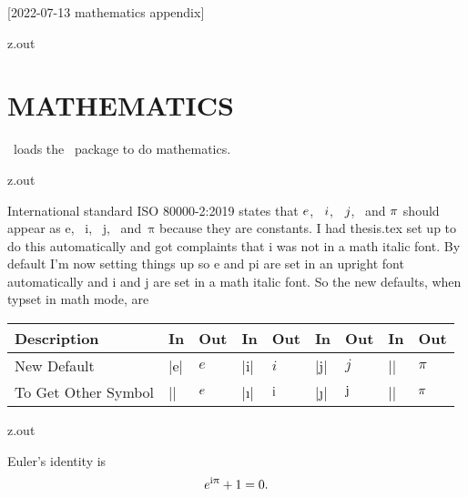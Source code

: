 [2022-07-13 mathematics appendix]

\begin{VerbatimOut}{z.out}
\chapter{MATHEMATICS}

\PurdueThesisLogo\ loads the \AMSmathLogo\ package
\cite{amslatex3project2019}
to do mathematics.
\end{VerbatimOut}

\MyIO




\begin{VerbatimOut}{z.out}

International standard ISO 80000-2:2019
\cite{iso8000022019}
states that \(\mit e\),~%
\(\mit i\),~%
\(\mit j\),~%
and \(\itpi\) should appear as
\(\mathup e\),~%
\(\mathup i\),~%
\(\mathup j\),~%
and~\(\mathup \pi\) because they are constants.
I had thesis.tex set up to do this automatically
and got complaints that i was not in a math italic font.
By default I'm now setting things up so e and pi
are set in an upright font automatically
and i and j are set in a math italic font.
So the new defaults, when typset in math mode, are
\begin{inlinetable}
  \begin{tabular}{@{}lllllllll@{}}
    \textbf{Description}&
      \textbf{In}& \textbf{Out}\qquad& \textbf{In}& \textbf{Out}\qquad&
      \textbf{In}& \textbf{Out}& \textbf{In}& \textbf{Out}\\
    \midrule
    New Default&               |e|&   \(e\)&    |i|&  \(i\)&  |j|&  \(j\)&  |\pi|&   \(\pi\)\\
    To Get Other Symbol\qquad& |\ite|& \(\mit{e}\)\quad& |\i|& \(\i\)\quad& |\j|& \(\j\)\quad& |\itpi|& \(\itpi\)\\
    \bottomrule
  \end{tabular}
\end{inlinetable}
\end{VerbatimOut}

\MyIO


\begin{VerbatimOut}{z.out}
  
Euler's identity is
\begin{equation*}
  e^{\i\pi} + 1 = 0.
\end{equation*}
\end{VerbatimOut}


